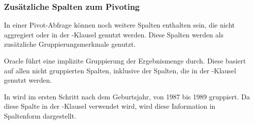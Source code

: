         \subsubsection{Zus\"atzliche Spalten zum Pivoting}
          In einer Pivot-Abfrage k\"onnen noch weitere Spalten enthalten sein, die nicht aggregiert oder in der -Klausel genutzt werden. Diese Spalten werden als zus\"atzliche Gruppierungsmerkmale genutzt.
          \begin{merke}
            Oracle f\"uhrt eine implizite Gruppierung der Ergebnismenge durch. Diese basiert auf allen nicht gruppierten Spalten, inklusive der Spalten, die in der -Klausel genutzt werden.
          \end{merke}
          In  wird im ersten Schritt nach dem Geburtsjahr, von 1987 bis 1989 gruppiert. Da diese Spalte in der -Klausel verwendet wird, wird diese Information in Spaltenform dargestellt.

